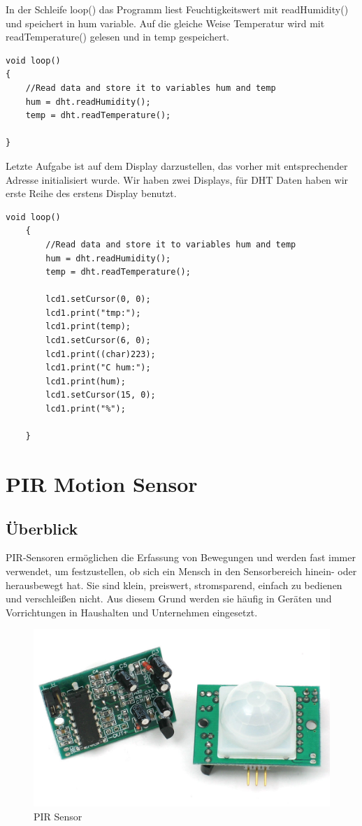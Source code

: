 \documentclass[conference]{IEEEtran}
\begin{document}
In der Schleife \textsf{loop()} das Programm liest Feuchtigkeitswert mit \textsf{readHumidity()} und speichert in \textsf{hum} variable. Auf die gleiche Weise Temperatur wird mit \textsf{readTemperature()} gelesen und in \textsf{temp} gespeichert. 

\begin{lstlisting}[style=CStyle]
void loop()
{
	//Read data and store it to variables hum and temp
	hum = dht.readHumidity();
	temp = dht.readTemperature();
	
}
\end{lstlisting}

Letzte Aufgabe ist auf dem Display darzustellen, das vorher  mit entsprechender Adresse initialisiert wurde. Wir haben zwei Displays, für DHT Daten haben wir erste Reihe des erstens Display benutzt. 

\begin{lstlisting}[style=CStyle]
	void loop()
	{
		//Read data and store it to variables hum and temp
		hum = dht.readHumidity();
		temp = dht.readTemperature();
		
		lcd1.setCursor(0, 0);
		lcd1.print("tmp:");
		lcd1.print(temp); 
		lcd1.setCursor(6, 0);
		lcd1.print((char)223);
		lcd1.print("C hum:");
		lcd1.print(hum);
		lcd1.setCursor(15, 0);
		lcd1.print("%");
		
	}
\end{lstlisting}

\section{PIR Motion Sensor}
\subsection{Überblick}
PIR-Sensoren ermöglichen die Erfassung von Bewegungen und werden fast immer verwendet, um festzustellen, ob sich ein Mensch in den Sensorbereich hinein- oder herausbewegt hat. Sie sind klein, preiswert, stromsparend, einfach zu bedienen und verschleißen nicht. Aus diesem Grund werden sie häufig in Geräten und Vorrichtungen in Haushalten und Unternehmen eingesetzt. 
	
\begin{figure}
	\begin{center}
		\includegraphics[scale=0.15]{pir1}
	\end{center}
	\caption{PIR Sensor}
\end{figure}
\end{document}
